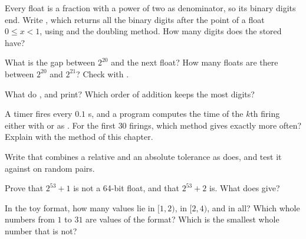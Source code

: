 \begin{exercise}[$\star\star$]\label{exo:g10:floating-point:7}
Every float is a fraction with a power of two as denominator, so its binary digits end. Write
, which returns all the binary digits after the point of a float $0 \le x < 1$, using
 and the doubling method. How many digits does the stored  have?
\end{exercise}

\begin{exercise}[$\star\star$]\label{exo:g10:floating-point:8}
What is the gap between $2^{20}$ and the next float? How many floats are there between $2^{20}$ and $2^{21}$? Check
with .
\end{exercise}

\begin{exercise}[$\star\star$]\label{exo:g10:floating-point:9}
What do ,  and  print? Which order of
addition keeps the most digits?
\end{exercise}

\begin{exercise}[$\star\star$]\label{exo:g10:floating-point:10}
A timer fires every $0.1$ s, and a program computes the time of the $k$th firing either with  or as
. For the first $30$ firings, which method gives  exactly more often? Explain with the
method of this chapter.
\end{exercise}

\begin{exercise}[$\star\star$]\label{exo:g10:floating-point:11}
Write  that combines a relative and an absolute tolerance as
 does, and test it against  on random pairs.
\end{exercise}

\begin{exercise}[$\star\star\star$]\label{exo:g10:floating-point:12}
Prove that $2^{53} + 1$ is not a 64-bit float, and that $2^{53} + 2$ is. What does  give?
\end{exercise}

\begin{exercise}[$\star\star\star$]\label{exo:g10:floating-point:13}
In the toy format, how many values lie in $[1, 2)$, in $[2, 4)$, and in all? Which whole numbers from $1$ to $31$ are
values of the format? Which is the smallest whole number that is not?
\end{exercise}

